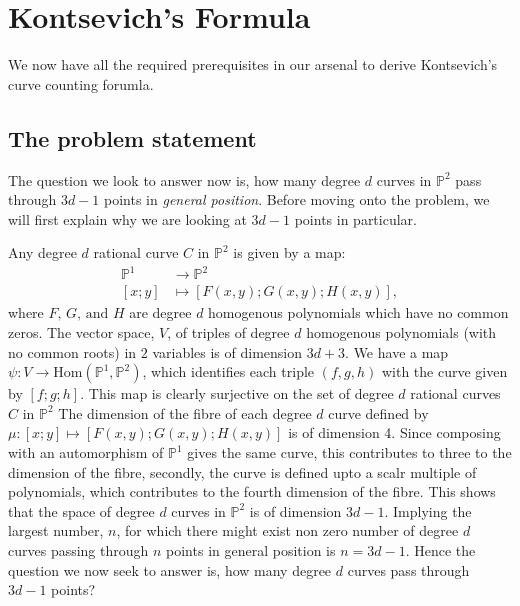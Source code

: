 \section{Kontsevich's Formula}

We now have all the required prerequisites in our arsenal to derive Kontsevich's curve counting forumla.

\subsection{The problem statement}
The question we look to answer now is, how many degree $d$ curves in $\mathbb{P}^{2}$ pass through $3d-1$ points in \textit{general position}. 
Before moving onto the problem, we will first explain why we are looking at $3d-1$ points in particular.

\begin{remark}
    \label{why3d1points}
    Any degree $d$ rational curve $C$ in $\mathbb{P}^{2}$ is given by a map:
\begin{align*}
    \mathbb{P}^{1} &\to \mathbb{P}^{2}\\
    [x;y] &\mapsto [F(x,y);G(x,y);H(x,y)],
\end{align*}
where $F,\,G,\,\text{and }H$ are degree $d$ homogenous polynomials which have no common zeros.
The vector space, $V$, of triples of degree $d$ homogenous polynomials (with no common roots) in $2$ variables is of dimension $3d+3$.
We have a map $\psi: V \to \text{Hom}(\mathbb{P}^{1}, \mathbb{P}^{2})$, which identifies each triple $(f,g,h)$ with the curve given by $[f;g;h]$.
This map is clearly surjective on the set of degree $d$ rational curves $C$ in $\mathbb{P}^{2}$
The dimension of the fibre of each degree $d$ curve defined by $\mu : [x;y] \mapsto [F(x,y);G(x,y);H(x,y)]$ is of dimension 4.
Since composing with an automorphism of $\mathbb{P}^{1}$ gives the same curve, this contributes to three to the dimension of the fibre, secondly, the curve is defined upto a scalr multiple of polynomials, which contributes to the fourth dimension of the fibre.
This shows that the space of degree $d$ curves in $\mathbb{P}^{2}$ is of dimension $3d-1$.
Implying the largest number, $n$, for which there might exist non zero number of degree $d$ curves passing through $n$ points in general position is $n = 3d-1$.
Hence the question we now seek to answer is, how many degree $d$ curves pass through $3d-1$ points?
   
\end{remark}

